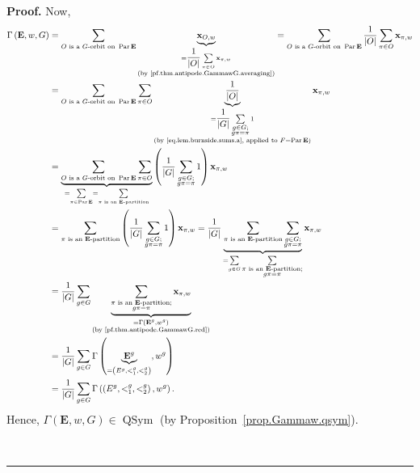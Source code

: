 \documentclass[numbers=enddot,12pt,final,onecolumn,notitlepage,abstracton]{scrartcl}
\theoremstyle{definition}
\newenvironment{proof}[1][Proof]{\noindent\textbf{#1.} }{\ \rule{0.5em}{0.5em}}
\let\sumnonlimits\sum
\renewcommand{\sum}{\sumnonlimits\limits}
\newcommand{\xx}{{\mathbf{x}}}
\newcommand{\QSym}{{\operatorname{QSym}}}
\newcommand{\Par}{\operatorname{Par}}
\newcommand{\EE}{{\mathbf{E}}}
\begin{document}
\begin{proof}
Now,
\begin{align}
\Gamma\left( \EE , w, G\right)   &  =\sum_{O\text{ is a
}G\text{-orbit on } \Par \EE }\underbrace{\xx_{O,w}}_{
\substack{=\dfrac{1}{\left\vert O\right\vert }\sum\limits_{\pi\in
O}\xx_{\pi,w}\\\text{(by \eqref{pf.thm.antipode.GammawG.averaging})}%
}}=\sum_{O\text{ is a }G\text{-orbit on } \Par \EE }
\dfrac{1}{\left\vert O\right\vert }\sum\limits_{\pi\in O}\xx_{\pi
,w}\nonumber\\
&  =\sum_{O\text{ is a }G\text{-orbit on } \Par \EE
}\sum\limits_{\pi\in O}\underbrace{\dfrac{1}{\left\vert O\right\vert }%
}_{\substack{=\dfrac{1}{\left\vert G\right\vert }\sum_{\substack{g\in
G;\\g\pi=\pi}}1\\\text{(by \eqref{eq.lem.burnside.sums.a}, applied to }
F = \Par\EE {)}}}\xx_{\pi,w}
\nonumber\\
& = \underbrace{\sum_{O \text{ is a } G\text{-orbit on } \Par \EE}
\sum\limits_{\pi\in O}}_{=\sum_{\pi\in \Par \EE }
=\sum_{\pi\text{ is an } \EE \text{-partition}}}
\left(
\dfrac{1}{\left\vert G\right\vert }\sum_{\substack{g\in G;\\g\pi=\pi
}}1\right)  \xx_{\pi,w}\nonumber\\
&  =\sum_{\pi\text{ is an } \EE \text{-partition}}\left(  \dfrac
{1}{\left\vert G\right\vert }\sum_{\substack{g\in G;\\g\pi=\pi}}1\right)
\xx_{\pi,w}=\dfrac{1}{\left\vert G\right\vert }\underbrace{\sum
_{\pi\text{ is an } \EE \text{-partition}}\sum_{\substack{g\in
G;\\g\pi=\pi}}}_{=\sum_{g\in G}\sum_{\substack{\pi\text{ is an }\EE
\text{-partition;}\\g\pi=\pi}}}\xx_{\pi,w}\nonumber\\
&  =\dfrac{1}{\left\vert G\right\vert }\sum_{g\in G}\underbrace{\sum
_{\substack{\pi\text{ is an } \EE \text{-partition;}\\g\pi=\pi
}}\xx_{\pi,w}}_{\substack{=\Gamma\left(   \EE ^{g},w^{g}\right)
\\\text{(by \eqref{pf.thm.antipode.GammawG.red})}}}\nonumber\\
&  =\dfrac{1}{\left\vert G\right\vert }\sum_{g\in G}\Gamma\left(
\underbrace{ \EE ^{g}}_{=\left(  E^{g},<_{1}^{g},<_{2}^{g}\right)
},w^{g}\right)  \nonumber\\
&=\dfrac{1}{\left\vert G\right\vert }\sum_{g\in G}\Gamma\left(
\left(  E^{g},<_{1}^{g},<_{2}^{g}\right)  ,w^{g}\right)
.
\label{pf.thm.antipode.GammawG.1}
\end{align}
Hence, $\Gamma\left(  { \EE },w,G\right) \in \QSym$
(by Proposition~\ref{prop.Gammaw.qsym}).


\end{proof}
\end{document}
